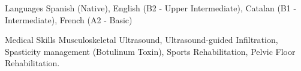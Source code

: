 

\begin{cvskills}

  \cvskill
    {Languages} %
    {Spanish (Native), English (B2 - Upper Intermediate), Catalan (B1 - Intermediate), French (A2 - Basic)} %

  \cvskill
    {Medical Skills} %
    {Musculoskeletal Ultrasound, Ultrasound-guided Infiltration, Spasticity management (Botulinum Toxin), Sports Rehabilitation, Pelvic Floor Rehabilitation.} %

\end{cvskills}
